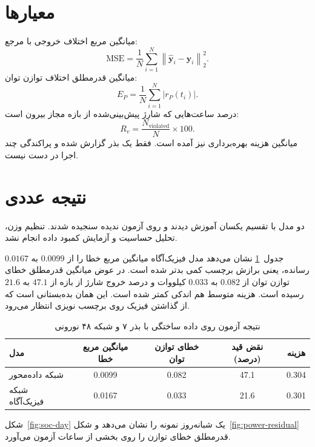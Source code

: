 \section{معیارها}
میانگین مربع اختلاف خروجی با مرجع:
\begin{equation}
  \mathrm{MSE}=\frac{1}{N}\sum_{i=1}^{N}
  \left\|\hat{\bm{y}}_i-\bm{y}_i\right\|_2^2.
  \label{eq:mse}
\end{equation}
میانگین قدرمطلق اختلاف توازن توان:
\begin{equation}
  E_{P}=\frac{1}{N}\sum_{i=1}^{N}|r_P(t_i)|.
  \label{eq:physics-metric}
\end{equation}
درصد ساعت‌هایی که شارژ پیش‌بینی‌شده از بازه مجاز بیرون است:
\begin{equation}
  R_{v}=\frac{N_{\mathrm{violated}}}{N}\times 100.
  \label{eq:violation-rate}
\end{equation}
میانگین هزینه بهره‌برداری نیز آمده است. فقط یک بذر گزارش شده و پراکندگی چند اجرا در دست نیست.

\section{نتیجه عددی}
دو مدل با تقسیم یکسان آموزش دیدند و روی آزمون ندیده سنجیده شدند. تنظیم وزن، تحلیل حساسیت و آزمایش کمبود داده انجام نشد.

جدول~\ref{tab:real-results} نشان می‌دهد مدل فیزیک‌آگاه میانگین مربع خطا را از $0.0099$ به $0.0167$ رسانده، یعنی برازش برچسب کمی بدتر شده است. در عوض میانگین قدرمطلق خطای توازن توان از $0.082$ به $0.033$ کیلووات و درصد خروج شارژ از بازه از $47.1$ به $21.6$ رسیده است. هزینه متوسط هم اندکی کمتر شده است. این همان بده‌بستانی است که از گذاشتن فیزیک روی برچسب نویزی انتظار می‌رود.

\begin{table}[H]
  \centering
  \caption{نتیجه آزمون روی داده ساختگی با بذر ۷ و شبکه ۴۸ نورونی}
  \label{tab:real-results}
  \begin{tabular}{lcccc}
    \toprule
    مدل & میانگین مربع خطا & خطای توازن توان & نقض قید (درصد) & هزینه \\
    \midrule
    شبکه داده‌محور & 0.0099 & 0.082 & 47.1 & 0.304 \\
    شبکه فیزیک‌آگاه & 0.0167 & 0.033 & 21.6 & 0.301 \\
    \bottomrule
  \end{tabular}
\end{table}

شکل~\ref{fig:soc-day} یک شبانه‌روز نمونه را نشان می‌دهد و شکل~\ref{fig:power-residual} قدرمطلق خطای توازن را روی بخشی از ساعات آزمون می‌آورد.

